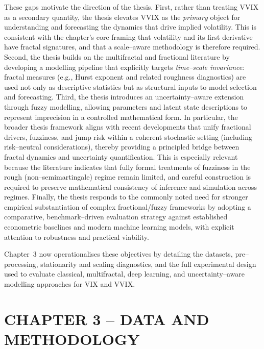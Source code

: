 \documentclass[12pt,a4paper]{report}
\numberwithin{equation}{section}
\begin{document}
These gaps motivate the direction of the thesis. First, rather than treating VVIX as a secondary quantity, the thesis elevates VVIX as the \emph{primary} object for understanding and forecasting the dynamics that drive implied volatility. This is consistent with the chapter’s core framing that volatility and its first derivative have fractal signatures, and that a scale--aware methodology is therefore required. Second, the thesis builds on the multifractal and fractional literature by developing a modelling pipeline that explicitly targets \emph{time--scale invariance}: fractal measures (e.g., Hurst exponent and related roughness diagnostics) are used not only as descriptive statistics but as structural inputs to model selection and forecasting. Third, the thesis introduces an uncertainty--aware extension through fuzzy modelling, allowing parameters and latent state descriptions to represent imprecision in a controlled mathematical form. In particular, the broader thesis framework aligns with recent developments that unify fractional drivers, fuzziness, and jump risk within a coherent stochastic setting (including risk--neutral considerations), thereby providing a principled bridge between fractal dynamics and uncertainty quantification. This is especially relevant because the literature indicates that fully formal treatments of fuzziness in the rough (non--semimartingale) regime remain limited, and careful construction is required to preserve mathematical consistency of inference and simulation across regimes. Finally, the thesis responds to the commonly noted need for stronger empirical substantiation of complex fractional/fuzzy frameworks by adopting a comparative, benchmark--driven evaluation strategy against established econometric baselines and modern machine learning models, with explicit attention to robustness and practical viability.

Chapter~3 now operationalises these objectives by detailing the datasets, pre--processing, stationarity and scaling diagnostics, and the full experimental design used to evaluate classical, multifractal, deep learning, and uncertainty--aware modelling approaches for VIX and VVIX.

\hypertarget{chapter--3------data--and--methodology}{%
\chapter{\texorpdfstring{\textbf{CHAPTER 3 -- DATA AND
METHODOLOGY}}{CHAPTER 3 -- DATA AND METHODOLOGY}}\label{chapter--3------data--and--methodology}}
\end{document}
